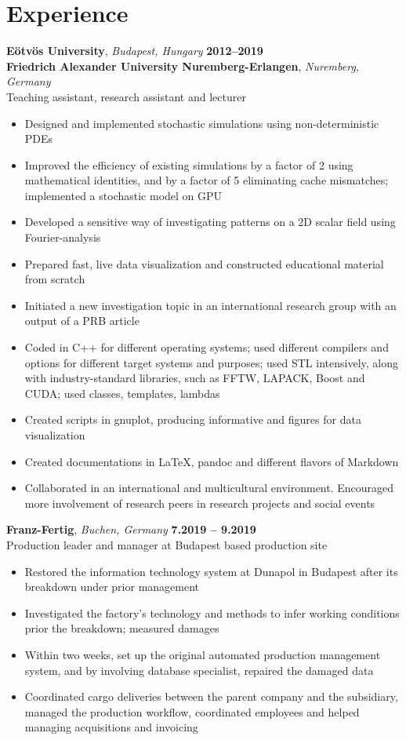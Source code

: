 \documentclass[10pt,USletter,sans]{moderncv}        %
\begin{document}
\section{Experience}
\textbf{Eötvös University}, \emph{Budapest, Hungary}  \hfill \textbf{2012--2019}\\
\textbf{Friedrich Alexander University Nuremberg-Erlangen}, \emph{Nuremberg, Germany}\\
Teaching assistant, research assistant and lecturer
\begin{itemize}
\item Designed and implemented stochastic simulations using non-deterministic PDEs
\item Improved the efficiency of existing simulations by a factor of 2 using mathematical identities, and by a factor of 5 eliminating cache mismatches; implemented a stochastic model on GPU
\item Developed a sensitive way of investigating patterns on a 2D scalar field using Fourier-analysis
\item Prepared fast, live data visualization and constructed educational material from scratch
\item Initiated a new investigation topic in an international research group with an output of a PRB article
\item Coded in C++ for different operating systems; used different compilers and options for different target systems and purposes; used STL intensively, along with industry-standard libraries, such as FFTW, LAPACK, Boost and CUDA; used classes, templates, lambdas
\item Created scripts in gnuplot, producing informative and figures for data visualization
\item Created documentations in LaTeX, pandoc and different flavors of Markdown
\item Collaborated in an international and multicultural environment. Encouraged more involvement of research peers in research projects and social events
\end{itemize}
\vspace{6pt}

\textbf{Franz-Fertig}, \emph{Buchen, Germany}  \hfill \textbf{7.2019 -- 9.2019}\\
Production leader and manager at Budapest based production site

\begin{itemize}
\item Restored the information technology system at Dunapol in Budapest after its breakdown under prior management
\item Investigated the factory's technology and methods to infer working conditions prior the breakdown; measured damages
\item Within two weeks, set up the original automated production management system, and by involving database specialist, repaired the damaged data
\item Coordinated cargo deliveries between the parent company and the subsidiary, managed the production workflow, coordinated employees and helped managing acquisitions and invoicing
\end{itemize}
\vspace{3pt}
\end{document}
